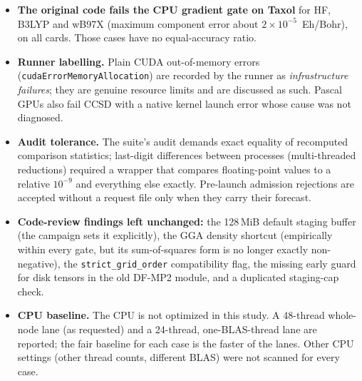 \begin{itemize}[leftmargin=*,itemsep=2pt]
\item \textbf{The original code fails the CPU gradient gate on Taxol} for HF, B3LYP and wB97X (maximum component error about $2\times10^{-5}$~Eh/Bohr), on all cards. Those cases have no equal-accuracy ratio.
\item \textbf{Runner labelling.} Plain CUDA out-of-memory errors (\texttt{cudaErrorMemoryAllocation}) are recorded by the runner as \emph{infrastructure failures}; they are genuine resource limits and are discussed as such. Pascal GPUs also fail CCSD with a native kernel launch error whose cause was not diagnosed.
\item \textbf{Audit tolerance.} The suite's audit demands exact equality of recomputed comparison statistics; last-digit differences between processes (multi-threaded reductions) required a wrapper that compares floating-point values to a relative $10^{-9}$ and everything else exactly. Pre-launch admission rejections are accepted without a request file only when they carry their forecast.
\item \textbf{Code-review findings left unchanged:} the 128\,MiB default staging buffer (the campaign sets it explicitly), the GGA density shortcut (empirically within every gate, but its sum-of-squares form is no longer exactly non-negative), the \texttt{strict\_grid\_order} compatibility flag, the missing early guard for disk tensors in the old DF-MP2 module, and a duplicated staging-cap check.
\item \textbf{CPU baseline.} The CPU is not optimized in this study. A 48-thread whole-node lane (as requested) and a 24-thread, one-BLAS-thread lane are reported; the fair baseline for each case is the faster of the lanes. Other CPU settings (other thread counts, different BLAS) were not scanned for every case.
\end{itemize}

